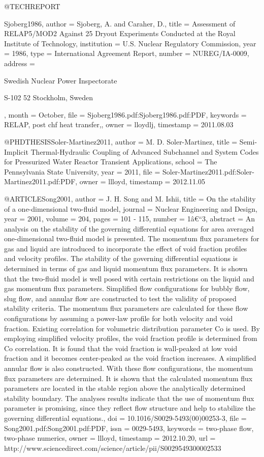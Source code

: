 {{@TECHREPORT{Sjoberg1986,
  author = {Sjoberg, A. and Caraher, D.},
  title = {Assessment of RELAP5/MOD2 Against 25 Dryout Experiments Conducted
	at the Royal Institute of Technology},
  institution = {U.S. Nuclear Regulatory Commission},
  year = {1986},
  type = {International Agreement Report},
  number = {NUREG/IA-0009},
  address = {Swedish Nuclear Power Inspectorate
	
	S-102 52 Stockholm, Sweden},
  month = {October},
  file = {Sjoberg1986.pdf:Sjoberg1986.pdf:PDF},
  keywords = {RELAP, post chf heat transfer,},
  owner = {lloydlj},
  timestamp = {2011.08.03}
}

@PHDTHESIS{Soler-Martinez2011,
  author = {M. D. Soler-Martinez},
  title = {Semi-Implicit Thermal-Hydraulic Coupling of Advanced Subchannel and
	System Codes for Pressurized Water Reactor Transient Applications},
  school = {The Pennsylvania State University},
  year = {2011},
  file = {Soler-Martinez2011.pdf:Soler-Martinez2011.pdf:PDF},
  owner = {llloyd},
  timestamp = {2012.11.05}
}

@ARTICLE{Song2001,
  author = {J. H. Song and M. Ishii},
  title = {On the stability of a one-dimensional two-fluid model},
  journal = {Nuclear Engineering and Design},
  year = {2001},
  volume = {204},
  pages = {101 - 115},
  number = {1â€“3},
  abstract = {An analysis on the stability of the governing differential equations
	for area averaged one-dimensional two-fluid model is presented. The
	momentum flux parameters for gas and liquid are introduced to incorporate
	the effect of void fraction profiles and velocity profiles. The stability
	of the governing differential equations is determined in terms of
	gas and liquid momentum flux parameters. It is shown that the two-fluid
	model is well posed with certain restrictions on the liquid and gas
	momentum flux parameters. Simplified flow configurations for bubbly
	flow, slug flow, and annular flow are constructed to test the validity
	of proposed stability criteria. The momentum flux parameters are
	calculated for these flow configurations by assuming a power-law
	profile for both velocity and void fraction. Existing correlation
	for volumetric distribution parameter Co is used. By employing simplified
	velocity profiles, the void fraction profile is determined from Co
	correlation. It is found that the void fraction is wall-peaked at
	low void fraction and it becomes center-peaked as the void fraction
	increases. A simplified annular flow is also constructed. With these
	flow configurations, the momentum flux parameters are determined.
	It is shown that the calculated momentum flux parameters are located
	in the stable region above the analytically determined stability
	boundary. The analyses results indicate that the use of momentum
	flux parameter is promising, since they reflect flow structure and
	help to stabilize the governing differential equations.},
  doi = {10.1016/S0029-5493(00)00253-3},
  file = {Song2001.pdf:Song2001.pdf:PDF},
  issn = {0029-5493},
  keywords = {two-phase flow, two-phase numerics},
  owner = {llloyd},
  timestamp = {2012.10.20},
  url = {http://www.sciencedirect.com/science/article/pii/S0029549300002533}
}

}}
